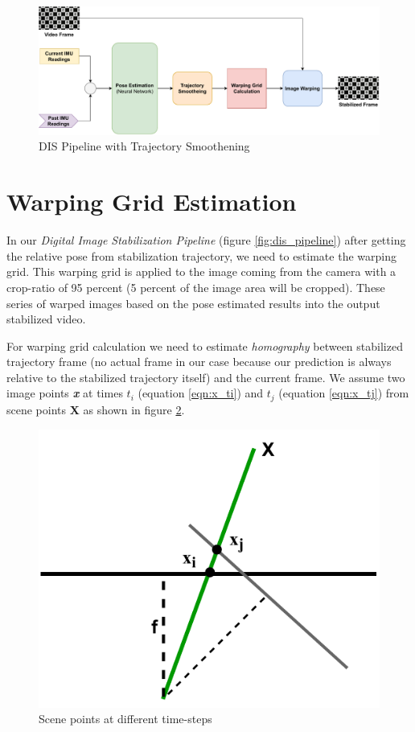 \begin{figure}
    \centering
    \includegraphics[scale=0.78]{images/fig_chapter4/dis_smooth_pipeline.pdf}
    \caption{DIS Pipeline with Trajectory Smoothening}
    \label{fig:dis_smooth_pipeline}
\end{figure}

\section{Warping Grid Estimation}
In our \textit{Digital Image Stabilization Pipeline} (figure \ref{fig:dis_pipeline}) after getting the relative pose from stabilization trajectory, we need to estimate the warping grid. This warping grid is applied to the image coming from the camera with a crop-ratio of 95 percent (5 percent of the image area will be cropped). These series of warped images based on the pose estimated results into the output stabilized video. 

For warping grid calculation we need to estimate \textit{homography} between stabilized trajectory frame (no actual frame in our case because our prediction is always relative to the stabilized trajectory itself) and the current frame. We assume two image points \textbf{\textit{x}} at times $ t_{i} $ (equation \ref{eqn:x_ti}) and $ t_{j} $ (equation \ref{eqn:x_tj}) from scene points \textbf{X} as shown in figure \ref{fig:dis_point_scene}.

\begin{figure}[H]
    \centering
    \includegraphics[scale=0.8]{images/fig_chapter4/dis_point_scene.pdf}
    \caption{Scene points at different time-steps}
    \label{fig:dis_point_scene}
\end{figure}


